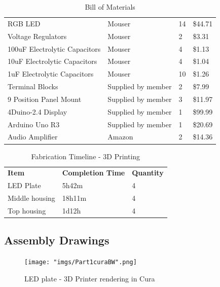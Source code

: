 \documentclass[12pt,a4paper]{report}
\begin{document}
\begin{table}[H]
\begin{center}
\begin{tabular}{llll}
RGB LED                       & Mouser          & 14       & \$44.71  \\
Voltage Regulators            & Mouser          & 2        & \$3.31   \\
100uF Electrolytic Capacitors & Mouser          & 4        & \$1.13   \\
10uF Electrolytic Capacitors  & Mouser          & 4        & \$1.04   \\
1uF Electrolytic Capacitors   & Mouser          & 10       & \$1.26   \\
Terminal Blocks               & Supplied by member        & 2        & \$7.99   \\
9 Position Panel Mount        & Supplied by member        & 3        & \$11.97  \\
4Duino-2.4 Display            & Supplied by member        & 1        & \$99.99  \\
Arduino Uno R3                & Supplied by member        & 1        & \$20.69 \\
Audio Amplifier               & Amazon                    & 2        & \$14.36
\end{tabular}
\end{center}
\caption {Bill of Materials}
\label{tab:title}
\end{table}
\thispagestyle{empty}
\newpage
\begin{table}[H]
\begin{center}
\begin{tabular}{lll}
\textbf{Item}          & \textbf{Completion Time} & \textbf{Quantity} \\
LED Plate     & 5h42m           & 4        \\
Middle housing & 18h11m          & 4        \\
Top housing   & 1d12h           & 4       
\end{tabular}
\end{center}
\caption {Fabrication Timeline - 3D Printing}
\label{tab:title}
\end{table}

\subsection{Assembly Drawings}
\begin{figure}[H]
	\centering
	\texttt{[image: "imgs/Part1curaBW".png]}\par			\vspace{0.1cm}
	\caption{LED plate - 3D Printer rendering in Cura}
\end{figure}
\end{document}
